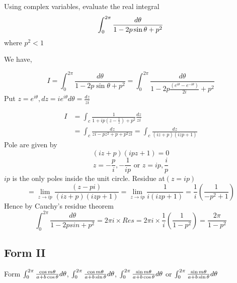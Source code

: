 \begin{example}
Using complex variables, evaluate the real integral
\[\displaystyle \int_{0}^{2\pi}\frac{d\theta}{1-2p\sin\theta+p^{2}}\] where $p^{2}<1$
\end{example}
\begin{solution}

We have,

\[
I=\int_{0}^{2\pi}\frac{d\theta}{1-2p\sin\theta+p^{2}}=\int_{0}^{2\pi}\frac{d\theta}{1-2p\frac{(e^{i\theta}-e^{-i\theta})}{2i}+p^{2}}\]
Put $z=e^{i\theta},dz=ie^{i\theta}d\theta=\frac{dz}{zi}$

\begin{align*}
I & =\int_{c}\frac{1}{1+ip(z-\frac{1}{z})+p^{2}}\frac{dz}{zi}\\
 & =\int_{c}\frac{dz}{zi-pz^{2}+p+p^{2}zi} =\int_{c}\frac{dz}{(iz+p)(izp+1)} 
\end{align*}
Pole are given by 
\[(iz+p)(ipz+1)=0\]
\[z=-\frac{p}{i},-\frac{1}{ip} \text{ or } z=ip,\frac{i}{p}\]
$ip$ is the only poles inside the unit circle. Residue at$(z=ip)$
\[=\lim_{z\rightarrow ip}\frac{(z-pi)}{(iz+p)(izp+1)}=\lim_{z\rightarrow ip}\frac{1}{i(izp+1)}=\frac{1}{i}\left(\frac{1}{-p^{2}+1}\right)\]
Hence by Cauchy's residue theorem 
\[\int_{0}^{2\pi}\frac{d\theta}{1-2psin+p^{2}}=2\pi i\times Res=2\pi i\times\frac{1}{i}\left(\frac{1}{1-p^{2}}\right)=\frac{2\pi}{1-p^{2}}\]
\end{solution}
\subsection{Form II}
Form $\int_0^{2\pi} {\cos m\theta \over a+b \cos\theta} d\theta$, $\int_0^{2\pi} {\cos m\theta \over a+b \sin\theta} d\theta$, $\int_0^{2\pi} {\sin m\theta \over a+b \cos\theta} d\theta$ or $\int_0^{2\pi} {\sin m\theta \over a+b \sin\theta} d\theta$

